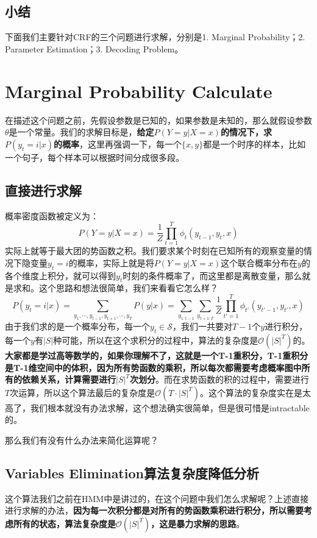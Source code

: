 \documentclass[a4paper]{article}
\begin{document}
\subsection{小结}
下面我们主要针对CRF的三个问题进行求解，分别是1. Marginal Probability；2. Parameter Estimation；3. Decoding Problem。

\section{Marginal Probability Calculate}
在描述这个问题之前，先假设参数是已知的，如果参数是未知的，那么就假设参数$\theta$是一个常量。我们的求解目标是，\textbf{给定$P(Y=y|X=x)$的情况下，求$P(y_t=i|x)$的概率}，这里再强调一下，每一个$\{x,y\}$都是一个时序的样本，比如一个句子，每个样本可以根据时间分成很多段。

\subsection{直接进行求解}
概率密度函数被定义为：
\begin{equation}
    P(Y=y|X=x) = \frac{1}{Z} \prod_{t=1}^T \phi_t(y_{t-1},y_t,x)
\end{equation}
实际上就等于最大团的势函数之积。我们要求某个时刻在已知所有的观察变量的情况下隐变量$y_t=i$的概率，实际上就是将$P(Y=y|X=x)$这个联合概率分布在$y$的各个维度上积分，就可以得到$y_t$时刻的条件概率了，而这里都是离散变量，那么就是求和。这个思路和想法很简单，我们来看看它怎么样？
\begin{equation}
    P(y_t=i|x) = \sum_{y_1,\cdots,y_{t-1},y_{t+1},\cdots,y_T} P(y|x) = \sum_{y_{1:t-1}} \sum_{y_{t+1:T}} \frac{1}{Z} \prod_{t'=1}^T \phi_{t'}(y_{t'-1},y_{t'},x)
\end{equation}
由于我们求的是一个概率分布，每一个$y_t \in \mathcal{S}$，我们一共要对$T-1$个$y$进行积分，每一个$y$有$|S|$种可能，所以在这个求积分的过程中，算法的复杂度是$\mathcal{O}(|S|^T)$的。\textbf{大家都是学过高等数学的，如果你理解不了，这就是一个T-1重积分，T-1重积分是T-1维空间中的体积，因为所有势函数的乘积，所以每次都需要考虑概率图中所有的依赖关系，计算需要进行$|S|^T$次划分}。而在求势函数的积的过程中，需要进行$T$次运算，所以这个算法最后的复杂度是$\mathcal{O}(T\cdot|S|^T)$。这个算法的复杂度实在是太高了，我们根本就没有办法求解，这个想法确实很简单，但是很可惜是intractable的。

那么我们有没有什么办法来简化运算呢？

\subsection{Variables Elimination算法复杂度降低分析}
这个算法我们之前在HMM中是讲过的，在这个问题中我们怎么求解呢？上述直接进行求解的办法，\textbf{因为每一次积分都是对所有的势函数乘积进行积分，所以需要考虑所有的状态，算法复杂度是$\mathcal{O}(|S|^T)$，这是暴力求解的思路}。
\end{document}
